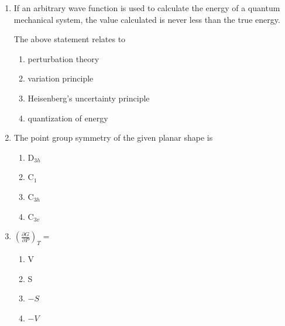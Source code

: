 \documentclass[journal,12pt,onecolumn]{IEEEtran}
\theoremstyle{remark}
\begin{document}
\begin{enumerate}
\item    \hspace{0.5 cm} If an arbitrary wave function is used to calculate the energy of a quantum mechanical system, the value calculated is never less than the true energy.

The above statement relates to  \hfill{}

\begin{multicols}{2}
\begin{enumerate}
    \item perturbation theory
    \item variation principle
    \item Heisenberg's uncertainty principle
    \item quantization of energy
\end{enumerate}
\end{multicols}
 

\item    \hspace{0.5 cm} The point group symmetry of the given planar shape is  \hfill{}

\begin{center}
\end{center}

\begin{multicols}{2}
\begin{enumerate}
    \item D$_{3h}$
    \item C$_1$
    \item C$_{3h}$
    \item C$_{3v}$
\end{enumerate}
\end{multicols} 
 

\item    \hspace{0.5cm} \( \left( \frac{\partial G}{\partial P} \right)_T = \)  \hfill{}

\begin{multicols}{2}
\begin{enumerate}
    \item V
    \item S
    \item $-S$
    \item $-V$
\end{enumerate}
\end{multicols}
 



\end{enumerate}
\end{document}
